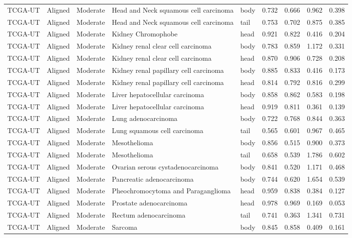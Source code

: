 \begin{longtable}{lllllrrrr}
TCGA-UT & Aligned & Moderate & Head and Neck squamous cell carcinoma & body & 0.732 & 0.666 & 0.962 & 0.398 \\
TCGA-UT & Aligned & Moderate & Head and Neck squamous cell carcinoma & tail & 0.753 & 0.702 & 0.875 & 0.385 \\
TCGA-UT & Aligned & Moderate & Kidney Chromophobe & head & 0.921 & 0.822 & 0.416 & 0.204 \\
TCGA-UT & Aligned & Moderate & Kidney renal clear cell carcinoma & body & 0.783 & 0.859 & 1.172 & 0.331 \\
TCGA-UT & Aligned & Moderate & Kidney renal clear cell carcinoma & head & 0.870 & 0.906 & 0.728 & 0.208 \\
TCGA-UT & Aligned & Moderate & Kidney renal papillary cell carcinoma & body & 0.885 & 0.833 & 0.416 & 0.173 \\
TCGA-UT & Aligned & Moderate & Kidney renal papillary cell carcinoma & head & 0.814 & 0.792 & 0.816 & 0.299 \\
TCGA-UT & Aligned & Moderate & Liver hepatocellular carcinoma & body & 0.858 & 0.862 & 0.583 & 0.198 \\
TCGA-UT & Aligned & Moderate & Liver hepatocellular carcinoma & head & 0.919 & 0.811 & 0.361 & 0.139 \\
TCGA-UT & Aligned & Moderate & Lung adenocarcinoma & body & 0.722 & 0.768 & 0.844 & 0.363 \\
TCGA-UT & Aligned & Moderate & Lung squamous cell carcinoma & tail & 0.565 & 0.601 & 0.967 & 0.465 \\
TCGA-UT & Aligned & Moderate & Mesothelioma & body & 0.856 & 0.515 & 0.900 & 0.373 \\
TCGA-UT & Aligned & Moderate & Mesothelioma & tail & 0.658 & 0.539 & 1.786 & 0.602 \\
TCGA-UT & Aligned & Moderate & Ovarian serous cystadenocarcinoma & body & 0.841 & 0.520 & 1.171 & 0.468 \\
TCGA-UT & Aligned & Moderate & Pancreatic adenocarcinoma & body & 0.744 & 0.620 & 1.654 & 0.539 \\
TCGA-UT & Aligned & Moderate & Pheochromocytoma and Paraganglioma & head & 0.959 & 0.838 & 0.384 & 0.127 \\
TCGA-UT & Aligned & Moderate & Prostate adenocarcinoma & head & 0.978 & 0.969 & 0.169 & 0.053 \\
TCGA-UT & Aligned & Moderate & Rectum adenocarcinoma & tail & 0.741 & 0.363 & 1.341 & 0.731 \\
TCGA-UT & Aligned & Moderate & Sarcoma & body & 0.845 & 0.858 & 0.409 & 0.161 \\

\end{longtable}
